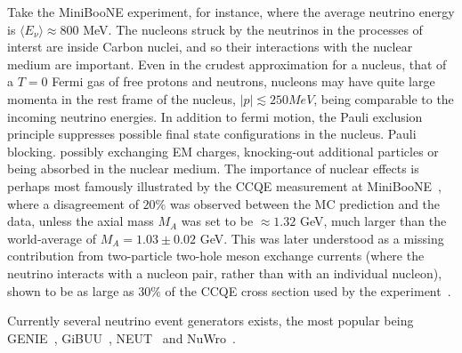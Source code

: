 Take the MiniBooNE experiment, for instance, where the average neutrino energy is $\langle E_\nu \rangle \approx 800 $ MeV. The nucleons struck by the neutrinos in the processes of interst are inside Carbon nuclei, and so their interactions with the nuclear medium are important. Even in the crudest approximation for a nucleus, that of a $T=0$ Fermi gas of free protons and neutrons, nucleons may have quite large momenta in the rest frame of the nucleus, $|p| \lesssim 250 MeV$, being comparable to the incoming neutrino energies. In addition to fermi motion, the Pauli exclusion principle suppresses possible final state configurations in the nucleus. Pauli blocking.  possibly exchanging EM charges, knocking-out additional particles or being absorbed in the nuclear medium. The importance of nuclear effects is perhaps most famously illustrated by the CCQE measurement at MiniBooNE~\cite{AguilarArevalo:2010zc}, where a disagreement of $20\%$ was observed between the MC prediction and the data, unless the axial mass $M_A$ was set to be $\approx1.32$ GeV, much larger than the world-average of $M_A = 1.03 \pm 0.02$ GeV. This was later understood as a missing contribution from two-particle two-hole meson exchange currents (where the neutrino interacts with a nucleon pair, rather than with an individual nucleon), shown to be as large as $30\%$ of the CCQE cross section used by the experiment~\cite{Nieves:2011yp}.

Currently several neutrino event generators exists, the most popular being GENIE~\cite{Andreopoulos:2009rq}, GiBUU~\cite{Buss:2011mx}, NEUT~\cite{Hayato:2002sd} and NuWro~\cite{Juszczak:2005zs}.
